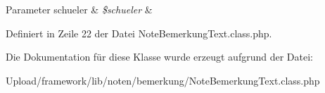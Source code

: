 \begin{DoxyParams}[1]{Parameter}
schueler & {\em \$schueler} & \\
\hline
\end{DoxyParams}


Definiert in Zeile 22 der Datei Note\+Bemerkung\+Text.\+class.\+php.



Die Dokumentation für diese Klasse wurde erzeugt aufgrund der Datei\+:\begin{DoxyCompactItemize}
\item 
Upload/framework/lib/noten/bemerkung/Note\+Bemerkung\+Text.\+class.\+php\end{DoxyCompactItemize}

